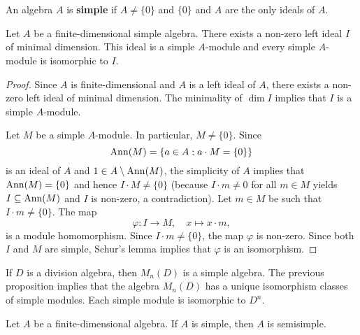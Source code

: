 \chapter{}
\label{03}

\begin{definition}
    An algebra $A$ is \textbf{simple} if $A\ne\{0\}$ and $\{0\}$ and $A$ are the only ideals of $A$. 
\end{definition}

\begin{proposition}
	Let $A$ be a finite-dimensional simple algebra. There exists a non-zero left ideal 
	$I$ of minimal dimension. This ideal is a simple 
	$A$-module and every simple $A$-module is isomorphic to $I$.
\end{proposition}

\begin{proof}
	Since $A$ is finite-dimensional and $A$ is a left ideal of $A$, there exists a non-zero left ideal of minimal dimension. The minimality 
	of $\dim I$ implies that $I$ is a simple $A$-module. 
	
	Let $M$ be a simple $A$-module. In particular, $M\ne\{0\}$. 
	Since  
	\[
	\operatorname{Ann}(M)=\{a\in A:a\cdot M=\{0\}\}
	\]
	is an ideal of $A$ and $1\in A\setminus\operatorname{Ann}(M)$, the simplicity of $A$ implies that 
	$\operatorname{Ann}(M)=\{0\}$ and hence $I\cdot M\ne \{0\}$ (because $I\cdot m\ne 0$ for all $m\in M$ yields  
	$I\subseteq\operatorname{Ann}(M)$ and $I$ is non-zero, a contradiction). Let $m\in M$ be such 
	that $I\cdot m\ne\{0\}$. The map 
	\[
	\varphi\colon I\to M,\quad
	x\mapsto x\cdot m,
	\]
	is a module homomorphism. Since $I\cdot m\ne\{0\}$, the map $\varphi$ is non-zero. 
	Since both $I$ and $M$ are simple, Schur's lemma implies that $\varphi$ is an isomorphism. 
\end{proof}

If $D$ is a division algebra, then $M_n(D)$ is a simple algebra. The previous proposition
implies that the algebra $M_n(D)$ has a unique isomorphism classes of simple modules. Each simple module
is isomorphic to $D^n$. 

\begin{proposition}
Let $A$ be a finite-dimensional algebra. If $A$ is simple, then $A$ is semisimple. 
\end{proposition}

